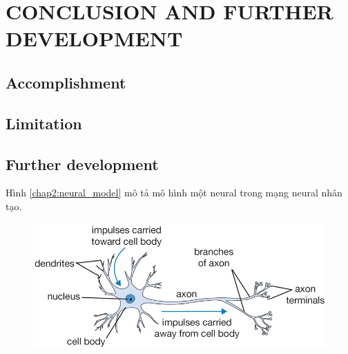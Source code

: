 \chapter{CONCLUSION AND FURTHER DEVELOPMENT}

\section{Accomplishment}
\section{Limitation}
\section{Further development}
Hình \ref{chap2:neural_model} mô tả mô hình một neural trong mạng neural nhân tạo.
\begin{center}
    \begin{figure}[H]
    \centering
    \includegraphics[width=0.6\columnwidth]{images/chap2/neuron.png}
    \label{chap2:animal_neural}
    \end{figure}
\end{center}



